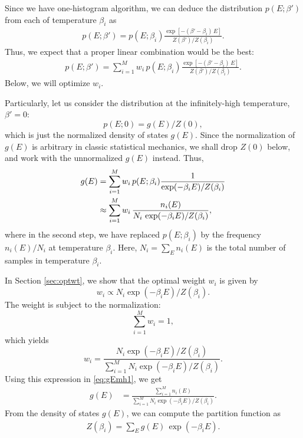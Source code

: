 \documentclass[12pt]{article}
\begin{document}
Since we have one-histogram algorithm,
we can deduce the distribution $p(E; \beta')$ from each of temperature $\beta_i$ as
\begin{align}
  p(E; \beta')
=
p(E; \beta_i) \frac{ \exp[ -(\beta' - \beta_i) \, E ] }
                   { Z(\beta') / Z(\beta_i) }.
\end{align}
%
Thus, we expect that a proper linear combination would be the best:
\begin{align}
  p(E; \beta')
=
\sum_{i = 1}^M
w_i \, p(E; \beta_i) \frac{ \exp[ -(\beta' - \beta_i) \, E ]}
                          { Z(\beta') / Z(\beta_i) }.
\label{eq:pEmh1}
\end{align}
Below, we will optimize $w_i$.



Particularly, let us consider the distribution at the infinitely-high temperature,
$\beta' = 0$:
\begin{equation}
  p(E; 0) = g(E) / Z(0),
\end{equation}
which is just the normalized density of states $g(E)$.
%
Since the normalization of $g(E)$ is arbitrary in classic statistical mechanics,
we shall drop $Z(0)$ below, and work with the unnormalized $g(E)$ instead.
%
Thus,
\begin{align}
  g(E)
  &=
\sum_{i = 1}^M w_i \, p(E; \beta_i)
  \frac{ 1 } { \exp( -\beta_i E )/Z(\beta_i) }
  \notag \\
  &\approx
\sum_{i = 1}^M w_i \,
\frac{ n_i(E) } { N_i \, \exp( -\beta_i E )/Z(\beta_i) },
\label{eq:gEmh1}
\end{align}
where in the second step,
we have replaced $p(E; \beta_i)$ by the frequency $n_i(E)/N_i$
at temperature $\beta_i$.
Here, $N_i = \sum_E n_i(E)$ is the total number of samples
in temperature $\beta_i$.


In Section \ref{sec:optwt},
we show that the optimal weight $w_i$ is given by
\begin{equation}
  w_i \propto N_i \exp( - \beta_i E) / Z(\beta_i).
  \label{eq:optwt1}
\end{equation}
The weight is subject to the normalization:
\begin{equation}
  \sum_{i=1}^M w_i = 1,
  \label{eq:wi_normalize}
\end{equation}
which yields
\begin{equation}
  w_i
=
\frac{ N_i \exp( - \beta_i E) / Z(\beta_i) }
    { \sum_{i = 1}^M N_i \exp( - \beta_i E) / Z(\beta_i) }.
\end{equation}
Using this expression in \eqref{eq:gEmh1}, we get
\begin{align}
  g(E)
&=
  \frac{ \sum_{i = 1}^M n_i(E) }
  { \sum_{i = 1}^M N_i \exp( - \beta_i E) / Z(\beta_i) }.
\label{eq:gEmh}
\end{align}
%
From the density of states $g(E)$,
we can compute the partition function as
\begin{align}
  Z(\beta_i) = \sum_E g(E) \, \exp( -\beta_i E ).
  \label{eq:Zimh}
\end{align}
\end{document}

